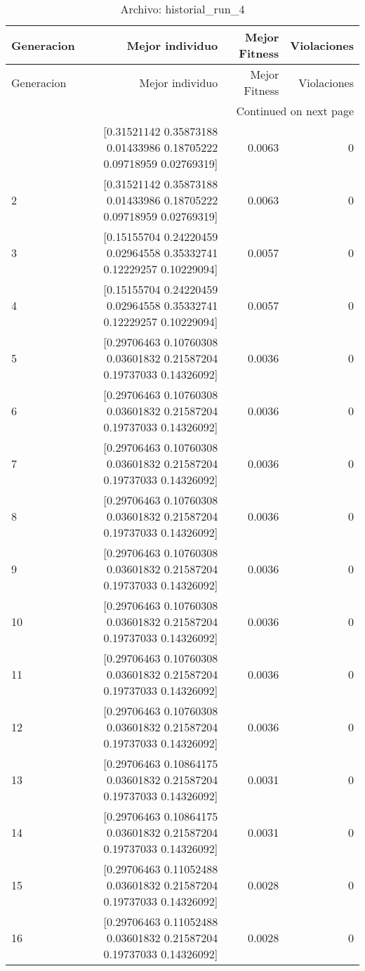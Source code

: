\begin{longtable}{lrrr}
\caption{Archivo: historial\_run\_4}\label{tab:historial_run_4} \\
\toprule
Generacion & Mejor individuo & Mejor Fitness & Violaciones \\
\midrule
\endfirsthead
\toprule
Generacion & Mejor individuo & Mejor Fitness & Violaciones \\
\midrule
\endhead
\midrule
\multicolumn{4}{r}{Continued on next page} \\
\midrule
\endfoot
\bottomrule
\endlastfoot
1 & [0.31521142 0.35873188 0.01433986 0.18705222 0.09718959 0.02769319] & 0.0063 & 0 \\
2 & [0.31521142 0.35873188 0.01433986 0.18705222 0.09718959 0.02769319] & 0.0063 & 0 \\
3 & [0.15155704 0.24220459 0.02964558 0.35332741 0.12229257 0.10229094] & 0.0057 & 0 \\
4 & [0.15155704 0.24220459 0.02964558 0.35332741 0.12229257 0.10229094] & 0.0057 & 0 \\
5 & [0.29706463 0.10760308 0.03601832 0.21587204 0.19737033 0.14326092] & 0.0036 & 0 \\
6 & [0.29706463 0.10760308 0.03601832 0.21587204 0.19737033 0.14326092] & 0.0036 & 0 \\
7 & [0.29706463 0.10760308 0.03601832 0.21587204 0.19737033 0.14326092] & 0.0036 & 0 \\
8 & [0.29706463 0.10760308 0.03601832 0.21587204 0.19737033 0.14326092] & 0.0036 & 0 \\
9 & [0.29706463 0.10760308 0.03601832 0.21587204 0.19737033 0.14326092] & 0.0036 & 0 \\
10 & [0.29706463 0.10760308 0.03601832 0.21587204 0.19737033 0.14326092] & 0.0036 & 0 \\
11 & [0.29706463 0.10760308 0.03601832 0.21587204 0.19737033 0.14326092] & 0.0036 & 0 \\
12 & [0.29706463 0.10760308 0.03601832 0.21587204 0.19737033 0.14326092] & 0.0036 & 0 \\
13 & [0.29706463 0.10864175 0.03601832 0.21587204 0.19737033 0.14326092] & 0.0031 & 0 \\
14 & [0.29706463 0.10864175 0.03601832 0.21587204 0.19737033 0.14326092] & 0.0031 & 0 \\
15 & [0.29706463 0.11052488 0.03601832 0.21587204 0.19737033 0.14326092] & 0.0028 & 0 \\
16 & [0.29706463 0.11052488 0.03601832 0.21587204 0.19737033 0.14326092] & 0.0028 & 0 \\

\end{longtable}
